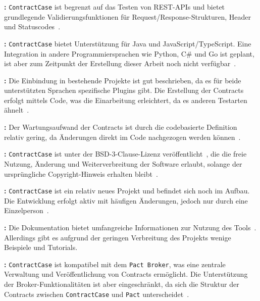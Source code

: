 \textbf{:} \texttt{ContractCase} ist begrenzt auf das Testen von \gls{REST}-\glspl{API} und bietet grundlegende Validierungsfunktionen für Request/Response-Strukturen, Header und Statuscodes~\cite{ContractCaseContractTesting}.

\textbf{:} \texttt{ContractCase} bietet Unterstützung für Java und JavaScript/TypeScript.
Eine Integration in andere Programmiersprachen wie Python, C\# und Go ist geplant, ist aber zum Zeitpunkt der Erstellung dieser Arbeit noch nicht verfügbar~\cite{CasecontracttestingContractcase2025}.

\textbf{:} Die Einbindung in bestehende Projekte ist gut beschrieben, da es für beide unterstützten Sprachen spezifische Plugins gibt.
Die Erstellung der Contracts erfolgt mittels Code, was die Einarbeitung erleichtert, da es anderen Testarten ähnelt~\cite{ContractCaseContractTesting}.

\textbf{:} Der Wartungsaufwand der Contracts ist durch die codebasierte Definition relativ gering, da Änderungen direkt im Code nachgezogen werden können~\cite{ContractCaseContractTesting}.

\textbf{:} \texttt{ContractCase} ist unter der \gls{BSD}-3-Clause-Lizenz veröffentlicht~\cite{CasecontracttestingContractcase2025}, die die freie Nutzung, Änderung und Weiterverbreitung der Software erlaubt, solange der ursprüngliche Copyright-Hinweis erhalten bleibt~\cite{BSD3ClauseNew}.

\textbf{:} \texttt{ContractCase} ist ein relativ neues Projekt und befindet sich noch im Aufbau.
Die Entwicklung erfolgt aktiv mit häufigen Änderungen, jedoch nur durch eine Einzelperson~\cite{CasecontracttestingContractcase2025}.

\textbf{:} Die Dokumentation bietet umfangreiche Informationen zur Nutzung des Tools~\cite{ContractCaseContractTesting}.
Allerdings gibt es aufgrund der geringen Verbreitung des Projekts wenige Beispiele und Tutorials.

\textbf{:} \texttt{ContractCase} ist kompatibel mit dem \texttt{Pact Broker}, was eine zentrale Verwaltung und Veröffentlichung von Contracts ermöglicht.
Die Unterstützung der Broker-Funktionalitäten ist aber eingeschränkt, da sich die Struktur der Contracts zwischen \texttt{ContractCase} und \texttt{Pact} unterscheidet~\cite{CasecontracttestingContractcase2025}.

